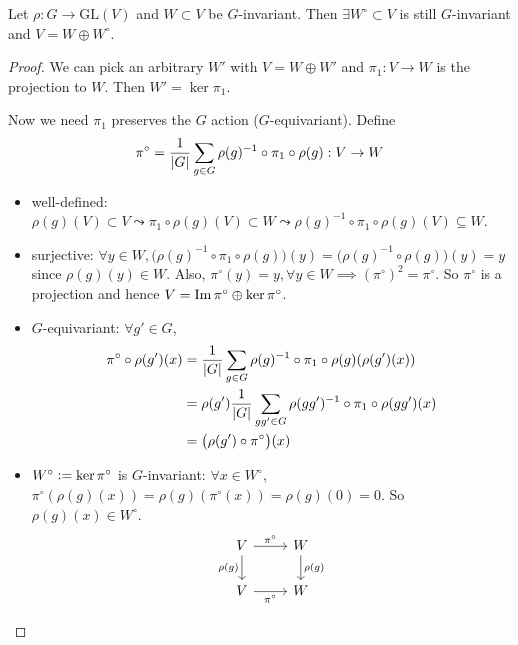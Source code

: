 \begin{theorem}
  Let $\rho: G \to \text{GL}(V)$ and $W \subset V$ be $G$-invariant.
  Then $\exists W^\circ \subset V$ is still $G$-invariant and
  $V = W \oplus W^\circ$.
  \begin{proof}
    We can pick an arbitrary $W'$ with $V = W \oplus W'$ and
    $\pi_1: V \to W$ is the projection to $W$. Then $W' = \ker \pi_1$.
    
    Now we need $\pi_1$ preserves the $G$ action ($G$-equivariant).
    Define
    \[
      \pi^\circ = \frac{1}{\lvert G\rvert} \sum_{g\in G}
      \rho(g)^{-1} \circ \pi_1 \circ \rho(g) : V \to W
    \]
    \begin{itemize}
      \item well-defined: $\rho(g)(V) \subset V \leadsto
        \pi_1 \circ \rho(g)(V) \subset W \leadsto
        \rho(g)^{-1} \circ \pi_1 \circ \rho(g)(V) \subseteq W$.
      \item surjective: $\forall y \in W,
        \big(\rho(g)^{-1}\circ \pi_1 \circ\rho(g)\big) (y) =
        \big(\rho(g)^{-1} \circ\rho(g)\big) (y) = y$ since
        $\rho(g)(y) \in W$. Also, $\pi^\circ(y) = y, \forall y \in W \implies 
        (\pi^\circ)^2 = \pi^\circ$.
        So $\pi^\circ$ is a projection and hence $V = \operatorname{Im} \pi^\circ \oplus \ker \pi^\circ$.
      \item $G$-equivariant: $\forall g' \in G$,
        \begin{align*}
          \pi^\circ \circ \rho(g')(x)
          &= \frac{1}{\lvert G\rvert} \sum_{g\in G}
            \rho(g)^{-1}\circ\pi_1\circ\rho(g) (\rho(g')(x)) \\
          &= \rho(g') \frac{1}{\lvert G\rvert} \sum_{gg'\in G}
            \rho(gg')^{-1}\circ\pi_1\circ\rho(gg')(x) \\
            &= \big(\rho(g') \circ \pi^\circ\big) (x)
        \end{align*}
      \item $W^\circ \vcentcolon= \ker \pi^\circ$ is $G$-invariant:
        $\forall x \in W^\circ$, $\pi^\circ(\rho(g)(x))
        = \rho(g)(\pi^\circ(x)) = \rho(g)(0) = 0$. So
        $\rho(g)(x) \in W^\circ$.
        \[
          \begin{tikzcd}
            V \arrow[d, "\rho(g)"'] \arrow[r, "\pi^\circ"] & W \arrow[d, "\rho(g)"] \\
            V \arrow[r, "\pi^\circ"'] & W
          \end{tikzcd}
          \qedhere
        \]
    \end{itemize}
  \end{proof}
\end{theorem}

